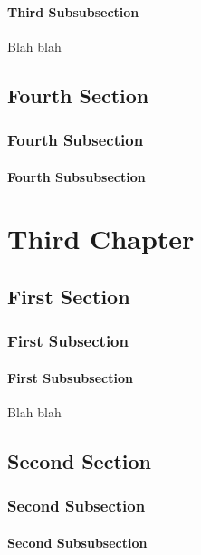 \documentclass[11pt]{book}
\begin{document}
\subsubsection{Third Subsubsection}

Blah blah

\section{Fourth Section}

\subsection{Fourth Subsection}

\subsubsection{Fourth Subsubsection}

\chapter{Third Chapter}

\section{First Section}

\subsection{First Subsection}

\subsubsection{First Subsubsection}

Blah blah

\section{Second Section}

\subsection{Second Subsection}

\subsubsection{Second Subsubsection}
\end{document}
